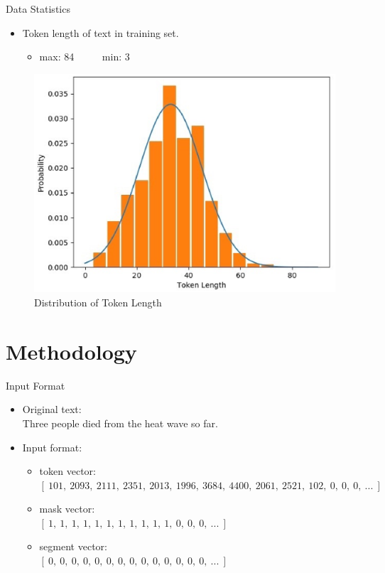 \documentclass[
 size=14pt,
 paper=smartboard,  %
 mode=present, 		%
 display=slides, 	%
 style=tuliplab,  	%
 pauseslide,
 fleqn,leqno]{powerdot}
\begin{document}
\begin{slide}[toc=,bm=]{Data Statistics}
	\begin{itemize}
		\item
		Token length of text in training set.
		\begin{itemize}
			\item
			max: 84 \ \ \ \ \ min: 3
		\end{itemize}
	\end{itemize}
	
	
	\begin{figure}
		\centering
		\includegraphics[scale=0.6]{token dist.eps}
		\caption{Distribution of Token Length}
	\end{figure}
	
\end{slide}



\section{Methodology}

\begin{slide}{Input Format}
	

		\begin{itemize}
			\item
			Original text: \\
			Three people died from the heat wave so far.
			\item
			Input format: 
			\begin{itemize}
				\item
				token vector: \\
				$[\ 101,\ 2093,\ 2111,\ 2351,\ 2013,\ 1996,\ 3684,\ 4400,\ 2061,\ 2521,\ 102,\ 0,\ 0,\ 0,\ ...\ ]$
				\item
				mask vector: \\
				$[\ 1,\ 1,\ 1,\ 1,\ 1,\ 1,\ 1,\ 1,\ 1,\ 1,\ 1,\ 0,\ 0,\ 0,\ ...\ ]$
				\item
				segment vector: \\
				$[\ 0,\ 0,\ 0,\ 0,\ 0,\ 0,\ 0,\ 0,\ 0,\ 0,\ 0,\ 0,\ 0,\ 0,\ ...\ ]$
			\end{itemize}
		\end{itemize}


\end{slide}
\end{document}
